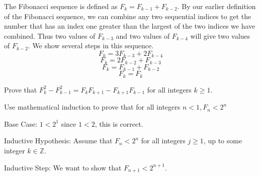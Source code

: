 \documentclass[12pt]{article}
\newenvironment{modenumerate}
  {\enumerate\setupmodenumerate}
  {\endenumerate}
\newif\ifmoditem
\newcommand{\setupmodenumerate}{%
  \global\moditemfalse
  \let\origmakelabel\makelabel
  \def\moditem##1{\global\moditemtrue\def\mesymbol{##1}\item}%
  \def\makelabel##1{%
    \origmakelabel{##1\ifmoditem\rlap{\mesymbol}\fi\enspace}%
    \global\moditemfalse}%
}
\begin{document}
\begin{modenumerate}
The Fibonacci sequence is defined as $F_{k}=F_{k-1}+F_{k-2}$. By our earlier definition of the Fibonacci
sequence, we can combine any two sequential indices to get the number that has an index one greater than the
largest of the two indices we have combined. Thus two values of $F_{k-3}$ and two values of $F_{k-4}$ will
give two values of $F_{k-2}$. We show several steps in this sequence.
  $$F_{k}=3F_{k-3}+2F_{k-4}$$
  $$F_{k}=2F_{k-2}+F_{k-3}$$
  $$F_{k}=F_{k-1}+F_{k-2}$$
  $$F_{k}=F_{k}$$

\item %
Prove that $F_k^2 - F_{k-1}^2 = F_k F_{k+1}-F_{k+1}F_{k-1}$ for all integers $k \geq 1$.

\setcounter{enumi}{30}
\moditem{*} Use mathematical induction to prove that for all integers $n < 1,
F_{n}<2^{n}$

Base Case: $1<2^{1}$ since $1<2$, this is correct.

Inductive Hypothesis: Assume that $F_{n}<2^{n}$ for all integers $j \geq 1$, up to some integer $k \in
\mathbb{Z}$.

Inductive Step: We want to show that $F_{n+1}<2^{n+1}$.

\end{modenumerate}
\end{document}
